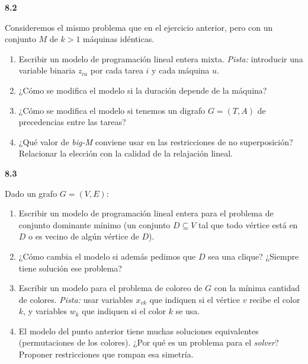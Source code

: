 \documentclass[11pt,a4paper]{article}
\newcommand{\ejercicio}[1]{\par\medskip\noindent\textbf{#1}\par\nopagebreak\smallskip}
\begin{document}
\ejercicio{8.2}
Consideremos el mismo problema que en el ejercicio anterior, pero con un
conjunto $M$ de $k > 1$ máquinas idénticas.
\begin{enumerate}
  \item Escribir un modelo de programación lineal entera mixta.
  \emph{Pista:} introducir una variable binaria $z_{iu}$ por cada tarea $i$ y
  cada máquina $u$.
  \item ¿Cómo se modifica el modelo si la duración depende de la máquina?
  \item ¿Cómo se modifica el modelo si tenemos un digrafo $G = (T, A)$ de
  precedencias entre las tareas?
  \item ¿Qué valor de \emph{big-M} conviene usar en las restricciones de no
  superposición? Relacionar la elección con la calidad de la relajación lineal.
\end{enumerate}

\ejercicio{8.3}
Dado un grafo $G = (V, E)$:
\begin{enumerate}
  \item Escribir un modelo de programación lineal entera para el problema de
  conjunto dominante mínimo (un conjunto $D \subseteq V$ tal que todo vértice
  está en $D$ o es vecino de algún vértice de $D$).
  \item ¿Cómo cambia el modelo si además pedimos que $D$ sea una clique?
  ¿Siempre tiene solución ese problema?
  \item Escribir un modelo para el problema de coloreo de $G$ con la mínima
  cantidad de colores. \emph{Pista:} usar variables $x_{vk}$ que indiquen si el
  vértice $v$ recibe el color $k$, y variables $w_k$ que indiquen si el color
  $k$ se usa.
  \item El modelo del punto anterior tiene muchas soluciones equivalentes
  (permutaciones de los colores). ¿Por qué es un problema para el
  \emph{solver}? Proponer restricciones que rompan esa simetría.
\end{enumerate}
\end{document}
